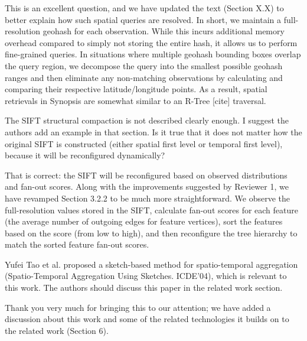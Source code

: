 \documentclass{article}
\begin{document}
\begin{tcolorbox}
This is an excellent question, and we have updated the text (Section
X.X) to better explain how such spatial queries are resolved. In short,
we maintain a full-resolution geohash for each observation. While this
incurs additional memory overhead compared to simply not storing the
entire hash, it allows us to perform fine-grained queries. In situations
where multiple geohash bounding boxes overlap the query region, we
decompose the query into the smallest possible geohash ranges and then
eliminate any non-matching observations by calculating and comparing
their respective latitude/longitude points. As a result, spatial
retrievals in Synopsis are somewhat similar to an R-Tree {[}cite{]}
traversal.
\end{tcolorbox}

The SIFT structural compaction is not described clearly enough. I
suggest the authors add an example in that section. Is it true that it
does not matter how the original SIFT is constructed (either spatial
first level or temporal first level), because it will be reconfigured
dynamically?

\begin{tcolorbox}
That is correct: the SIFT will be reconfigured based on observed
distributions and fan-out scores. Along with the improvements suggested
by Reviewer 1, we have revamped Section 3.2.2 to be much more
straightforward. We observe the full-resolution values stored in the
SIFT, calculate fan-out scores for each feature (the average number of
outgoing edges for feature vertices), sort the features based on the
score (from low to high), and then reconfigure the tree hierarchy to
match the sorted feature fan-out scores.
\end{tcolorbox}

Yufei Tao et al. proposed a sketch-based method for spatio-temporal
aggregation (Spatio-Temporal Aggregation Using Sketches. ICDE'04), which
is relevant to this work. The authors should discuss this paper in the
related work section.

\begin{tcolorbox}
Thank you very much for bringing this to our attention; we have added a
discussion about this work and some of the related technologies it
builds on to the related work (Section 6).
\end{tcolorbox}
\end{document}
